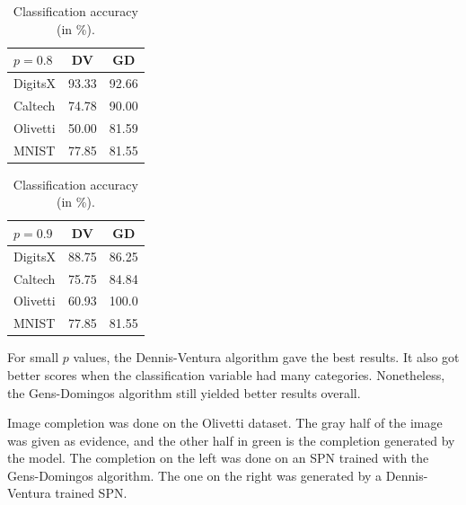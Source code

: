 \documentclass[final,hyperref={pdfpagelabels=false},notheorems]{beamer}
\theoremstyle{thesisstyle}
\newcommand{\pskip}{\vskip 0.5cm}
\begin{document}
\begin{frame}[t]
\begin{columns}[t]
\begin{column}{.5225\textwidth}
\begin{block}{}
\begin{table}[h]
        \begin{tabular}{l|c|c}
          $p=0.8$ & DV & GD\\
          \hline
          DigitsX & 93.33 & 92.66\\
          Caltech & 74.78 & 90.00\\
          Olivetti& 50.00 & 81.59\\
          MNIST   & 77.85 & 81.55\\
        \end{tabular}\hspace{2.5cm}
        \begin{tabular}{l|c|c}
          $p=0.9$ & DV & GD\\
          \hline
          DigitsX & 88.75 & 86.25\\
          Caltech & 75.75 & 84.84\\
          Olivetti& 60.93 & 100.0\\
          MNIST   & 77.85 & 81.55\\
        \end{tabular}
        \caption{Classification accuracy (in \%).}
      \end{table}

      For small $p$ values, the Dennis-Ventura algorithm gave the best results. It also got better
      scores when the classification variable had many categories. Nonetheless, the Gens-Domingos
      algorithm still yielded better results overall.\pskip

      Image completion was done on the Olivetti dataset. The gray half of the image was given as
      evidence, and the other half in green is the completion generated by the model. The
      completion on the left was done on an SPN trained with the Gens-Domingos algorithm. The one
      on the right was generated by a Dennis-Ventura trained SPN.\pskip


\end{block}
\end{column}
\end{columns}
\end{frame}
\end{document}
